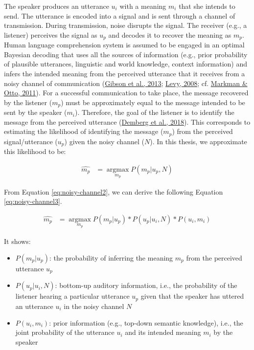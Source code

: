\documentclass[a4paper, nobind]{templates/ociamthesis}
\providecommand{\tightlist}{%
  \setlength{\itemsep}{0pt}\setlength{\parskip}{0pt}}
\begin{document}
The speaker produces an utterance \(u_i\) with a meaning \(m_i\) that she intends to send.
The utterance is encoded into a signal and is sent through a channel of transmission.
During transmission, noise disrupts the signal.
The receiver (e.g., a listener) perceives the signal as \(u_p\) and decodes it to recover the meaning as \(m_p\).
Human language comprehension system is assumed to be engaged in an optimal Bayesian decoding that uses all the sources of information
(e.g., prior probability of plausible utterances, linguistic and world knowledge, context information)
and infers the intended meaning from the perceived utterance that it receives from a noisy channel of communication (\protect\hyperlink{ref-Gibson2013}{Gibson et al., 2013}; \protect\hyperlink{ref-Levy2008}{Levy, 2008}; cf. \protect\hyperlink{ref-Markman2011}{Markman \& Otto, 2011}).
For a successful communication to take place, the message recovered by the listener (\(m_p\)) must be approximately equal to the message intended to be sent by the speaker (\(m_i\)).
Therefore, the goal of the listener is to identify the message from the perceived utterance (\protect\hyperlink{ref-Demberg2018}{Demberg et al., 2018}).
This corresponds to estimating the likelihood of identifying the message (\(m_p\)) from the perceived signal/utterance (\(u_p\)) given the noisy channel (\(N\)).
In this thesis, we approximate this likelihood to be:

\begin{align} \label{eq:noisy-channel2}
\hat{m_p} &= \mathop{\mathrm{argmax}}\limits_{m_p} P(m_p | u_p, N)
\end{align}

From Equation \eqref{eq:noisy-channel2}, we can derive the following Equation \eqref{eq:noisy-channel3}.

\begin{align} \label{eq:noisy-channel3}
\hat{m_p} &= \mathop{\mathrm{argmax}}\limits_{m_p} P(m_p | u_p) * P(u_p | u_i, N) * P(u_i , m_i)
\end{align}

It shows:

\begin{itemize}
\tightlist
\item
  \(P(m_p | u_p)\): the probability of inferring the meaning \(m_p\) from the perceived utterance \(u_p\)
\item
  \(P(u_p|u_i, N)\): bottom-up auditory information, i.e., the probability of the listener hearing a particular utterance \(u_p\) given that the speaker has uttered an utterance \(u_i\) in the noisy channel \(N\)
\item
  \(P(u_i,m_i)\): prior information (e.g., top-down semantic knowledge), i.e., the joint probability of the utterance \(u_i\) and its intended meaning \(m_i\) by the speaker
\end{itemize}
\end{document}
